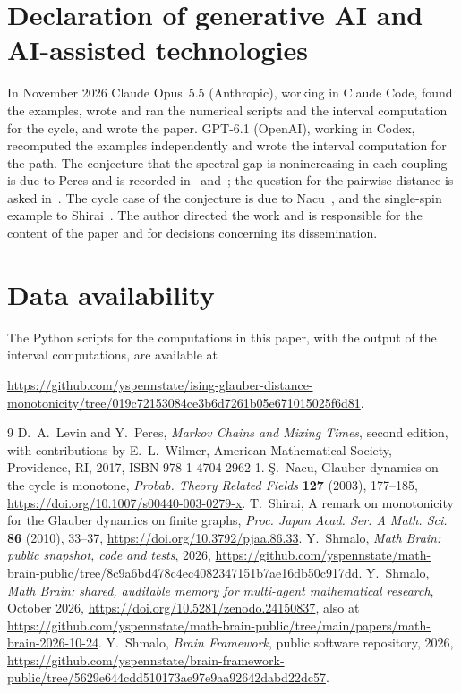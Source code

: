 \documentclass[11pt]{amsart}
\theoremstyle{remark}
\begin{document}
\section*{Declaration of generative AI and AI-assisted technologies}
In November 2026 Claude Opus~5.5 (Anthropic), working in Claude Code, found the examples, wrote and ran the numerical scripts and the interval computation for the cycle, and wrote the paper. GPT-6.1 (OpenAI), working in Codex, recomputed the examples independently and wrote the interval computation for the path. The conjecture that the spectral gap is nonincreasing in each coupling is due to Peres and is recorded in~\cite{Nacu} and~\cite{LP}; the question for the pairwise distance is asked in~\cite{LP}. The cycle case of the conjecture is due to Nacu~\cite{Nacu}, and the single-spin example to Shirai~\cite{Shirai}. The author directed the work and is responsible for the content of the paper and for decisions concerning its dissemination.

\section*{Data availability}
The Python scripts for the computations in this paper, with the output of the interval computations, are available at
\begin{center}\url{https://github.com/yspennstate/ising-glauber-distance-monotonicity/tree/019c72153084ce3b6d7261b05e671015025f6d81}.\end{center}

\begin{thebibliography}{9}
 D.~A.~Levin and Y.~Peres, \emph{Markov Chains and Mixing Times}, second edition, with contributions by E.~L.~Wilmer, American Mathematical Society, Providence, RI, 2017, ISBN 978-1-4704-2962-1.
 \c{S}.~Nacu, Glauber dynamics on the cycle is monotone, \emph{Probab. Theory Related Fields} \textbf{127} (2003), 177--185, \url{https://doi.org/10.1007/s00440-003-0279-x}.
 T.~Shirai, A remark on monotonicity for the Glauber dynamics on finite graphs, \emph{Proc. Japan Acad. Ser. A Math. Sci.} \textbf{86} (2010), 33--37, \url{https://doi.org/10.3792/pjaa.86.33}.
 Y.~Shmalo, \emph{Math Brain: public snapshot, code and tests}, 2026, \url{https://github.com/yspennstate/math-brain-public/tree/8c9a6bd478c4ec4082347151b7ae16db50c917dd}.
 Y.~Shmalo, \emph{Math Brain: shared, auditable memory for multi-agent mathematical research}, October 2026, \url{https://doi.org/10.5281/zenodo.24150837}, also at \url{https://github.com/yspennstate/math-brain-public/tree/main/papers/math-brain-2026-10-24}.
 Y.~Shmalo, \emph{Brain Framework}, public software repository, 2026, \url{https://github.com/yspennstate/brain-framework-public/tree/5629e644cdd510173ae97e9aa92642dabd22dc57}.
\end{thebibliography}
\end{document}
